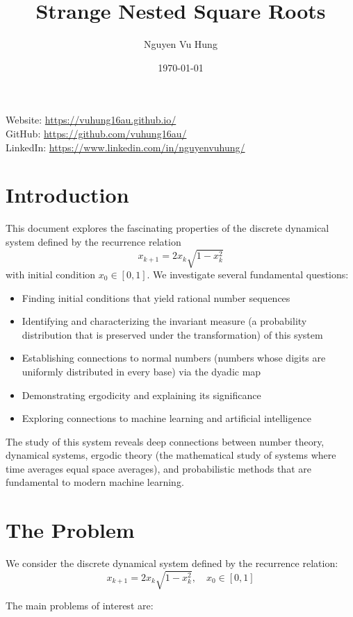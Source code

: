\documentclass[12pt,a4paper]{article}
\title{Strange Nested Square Roots}
\author{Nguyen Vu Hung}
\date{\today}
\begin{document}
\maketitle

\noindent Website: \url{https://vuhung16au.github.io/}\\
\noindent GitHub: \url{https://github.com/vuhung16au/}\\
\noindent LinkedIn: \url{https://www.linkedin.com/in/nguyenvuhung/}


\section{Introduction}

This document explores the fascinating properties of the discrete dynamical system defined by the recurrence relation
\[
x_{k+1} = 2x_k\sqrt{1 - x_k^2}
\]
with initial condition $x_0 \in [0,1]$. We investigate several fundamental questions:

\begin{itemize}
    \item Finding initial conditions that yield rational number sequences
    \item Identifying and characterizing the invariant measure (a probability distribution that is preserved under the transformation) of this system
    \item Establishing connections to normal numbers (numbers whose digits are uniformly distributed in every base) via the dyadic map
    \item Demonstrating ergodicity and explaining its significance
    \item Exploring connections to machine learning and artificial intelligence
\end{itemize}

The study of this system reveals deep connections between number theory, dynamical systems, ergodic theory (the mathematical study of systems where time averages equal space averages), and probabilistic methods that are fundamental to modern machine learning.

\section{The Problem}

We consider the discrete dynamical system defined by the recurrence relation:
\[
x_{k+1} = 2x_k\sqrt{1 - x_k^2}, \quad x_0 \in [0,1]
\]

The main problems of interest are:
\end{document}
